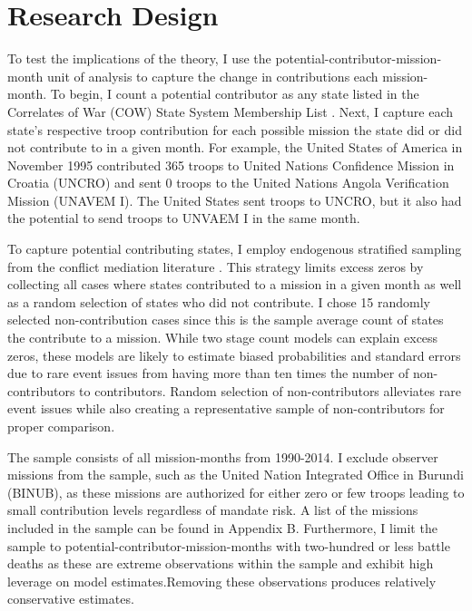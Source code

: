 \documentclass[12pt]{article}
\begin{document}
\section*{Research Design}

To test the implications of the theory, I use the potential-contributor-mission-month unit of analysis to capture the change in contributions each mission-month. To begin, I count a potential contributor as any state listed in the Correlates of War (COW) State System Membership List \citep{COW_list}. Next, I capture each state's respective troop contribution for each possible mission the state did or did not contribute to in a given month. For example, the United States of America in November 1995 contributed 365 troops to United Nations Confidence Mission in Croatia (UNCRO) and sent 0 troops to the United Nations Angola Verification Mission (UNAVEM I). The United States sent troops to UNCRO, but it also had the potential to send troops to UNVAEM I in the same month.

To capture potential contributing states, I employ endogenous stratified sampling \citep{king2001logistic} from the conflict mediation literature \citep[Ex.][]{savun2008}. This strategy limits excess zeros by collecting all cases where states contributed to a mission in a given month as well as a random selection of states who did not contribute. I chose 15 randomly selected non-contribution cases since this is the sample average count of states the contribute to a mission. While two stage count models can explain excess zeros, these models are likely to estimate biased probabilities and standard errors due to rare event issues \citep{king2001logistic} from having more than ten times the number of non-contributors to contributors. Random selection of non-contributors alleviates rare event issues while also creating a representative sample of non-contributors for proper comparison.

The sample consists of all mission-months from 1990-2014. I exclude observer missions from the sample, such as the United Nation Integrated Office in Burundi (BINUB), as these missions are authorized for either zero or few troops leading to small contribution levels regardless of mandate risk. A list of the missions included in the sample can be found in Appendix B. Furthermore, I limit the sample to potential-contributor-mission-months with two-hundred or less battle deaths as these are extreme observations within the sample and exhibit high leverage on model estimates.\footnotemark[9] Removing these observations produces relatively conservative estimates. 
\end{document}
